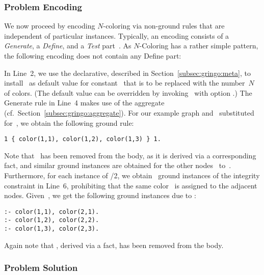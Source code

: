 \subsubsection{Problem Encoding}\label{subsec:color:encoding}

We now proceed by encoding $N$-coloring via non-ground rules that are
independent of particular instances.
Typically, an encoding consists of a \emph{Generate}, a \emph{Define},
and a \emph{Test} part~\cite{lifschitz02a}.
As $N$-Coloring has a rather simple pattern, the following encoding does
not contain any Define part:
%

%
In Line~2, we use the  declarative,
described in Section~\ref{subsec:gringo:meta},
to install~ as default value for constant~ that is to be replaced
with the number~$N$ of colors.
(The default value can be overridden by invoking \gringo\ with option
 .)
The Generate rule in Line~4 makes use of the  aggregate
(cf.\ Section~\ref{subsec:gringo:aggregate}).
For our example graph and~ substituted for~,
we obtain the following ground rule:%
%
\begin{lstlisting}[numbers=none]
1 { color(1,1), color(1,2), color(1,3) } 1.
\end{lstlisting}
%
Note that~ has been removed from the body,
as it is derived via a corresponding fact,
and similar ground instances are obtained for the other nodes~ to~.
Furthermore, for each instance of /2,
we obtain~ ground instances of the integrity constraint in Line~6,
prohibiting that the same color~ is assigned to the adjacent nodes.
Given~,
we get the following ground instances due to :
%
\begin{lstlisting}[numbers=none]
:- color(1,1), color(2,1).
:- color(1,2), color(2,2).
:- color(1,3), color(2,3).
\end{lstlisting}
%
Again note that ,
derived via a fact, has been removed from the body.

\subsubsection{Problem Solution}\label{subsec:color:solution}



